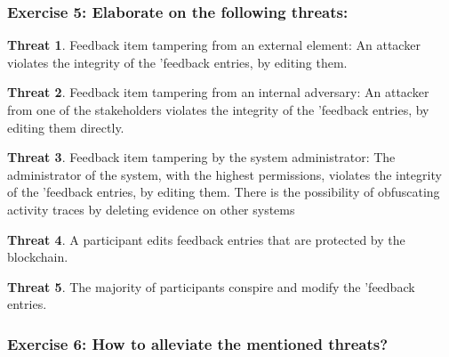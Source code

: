 \documentclass[12pt,a4paper]{article}
\theoremstyle{definition}
\newtheorem{threat}{Threat}[]
\begin{document}
\subsubsection*{Exercise 5: Elaborate on the following threats:}

\begin{threat}{Feedback item tampering from an external element:} An attacker violates the integrity of the 'feedback entries, by editing them. 
\end{threat}

\begin{threat}{Feedback item tampering from an internal adversary:} An attacker from one of the stakeholders violates the integrity of the 'feedback entries, by editing them directly.
\end{threat}


\begin{threat}{Feedback item tampering by the system administrator:} The administrator of the system, with the highest permissions, violates the integrity of the 'feedback entries, by editing them. There is the possibility of obfuscating activity traces by deleting evidence on other systems
\end{threat}


\begin{threat}{A participant edits feedback entries that are protected by the blockchain.}
\end{threat}


\begin{threat}The majority of participants conspire and modify the 'feedback entries.
\end{threat}

\subsubsection*{Exercise 6: How to alleviate the mentioned threats?}



\end{document}
